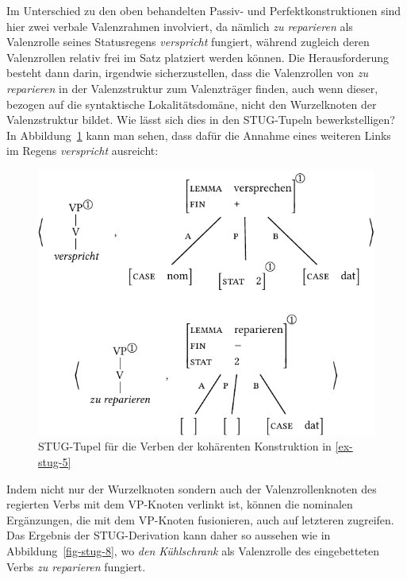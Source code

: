 Im Unterschied zu den oben behandelten Passiv- und Perfektkonstruktionen sind hier zwei verbale Valenzrahmen involviert, da nämlich {\it zu reparieren} als Valenzrolle seines Statusregens {\it verspricht} fungiert, während zugleich deren Valenzrollen relativ frei im Satz platziert werden können. Die Herausforderung besteht dann darin,  irgendwie sicherzustellen, dass die Valenzrollen von {\it zu reparieren} in der Valenzstruktur zum Valenzträger finden, auch wenn dieser, bezogen auf die syntaktische Lokalitätsdomäne, nicht den Wurzelknoten der Valenzstruktur bildet. Wie lässt sich dies in den STUG-Tupeln bewerkstelligen? In Abbildung~\ref{fig-stug-7} kann man sehen, dass dafür die Annahme eines weiteren Links im Regens {\it verspricht} ausreicht:
\begin{figure}[t]
\centering
\includegraphics{graphics/abb97.pdf}
\caption{\label{fig-stug-7}STUG-Tupel für die Verben der kohärenten Konstruktion in \ref{ex-stug-5}}
\end{figure}
Indem nicht nur der Wurzelknoten sondern auch der Valenzrollenknoten des regierten Verbs mit dem VP-Knoten verlinkt ist, können die nominalen Ergänzungen, die mit dem VP-Knoten fusionieren, auch auf letzteren zugreifen.  
Das Ergebnis der STUG-Derivation kann daher so aussehen wie in Abbildung~\ref{fig-stug-8}, wo {\it den Kühlschrank} als Valenzrolle des eingebetteten Verbs {\it zu reparieren} fungiert.
